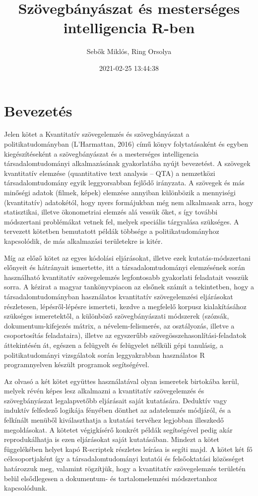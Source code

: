 \documentclass[
]{book}
\title{Szövegbányászat és mesterséges intelligencia R-ben}
\author{Sebők Miklós, Ring Orsolya}
\date{2021-02-25 13:44:38}
\begin{document}
\frontmatter
\maketitle

\mainmatter
\hypertarget{bevezetuxe9s}{%
\chapter{Bevezetés}\label{bevezetuxe9s}}

Jelen kötet a Kvantitatív szövegelemzés és szövegbányászat a
politikatudományban (L'Harmattan, 2016) című könyv folytatásaként és
egyben kiegészítéseként a szövegbányászat és a mesterséges intelligencia
társadalomtudományi alkalmazásának gyakorlatába nyújt bevezetést. A
szövegek kvantitatív elemzése (quantitative text analysis -- QTA) a
nemzetközi társadalomtudomány egyik leggyorsabban fejlődő irányzata. A
szövegek és más minőségi adatok (filmek, képek) elemzése annyiban
különbözik a mennyiségi (kvantitatív) adatokétól, hogy nyers formájukban
még nem alkalmasak arra, hogy statisztikai, illetve ökonometriai elemzés
alá vessük őket, s így további módszertani problémákat vetnek fel,
melyek speciális tárgyalása szükséges. A tervezett kötetben bemutatott
példák többsége a politikatudományhoz kapcsolódik, de más alkalmazási
területekre is kitér.

Míg az előző kötet az egyes kódolási eljárásokat, illetve ezek
kutatás-módszertani előnyeit és hátrányait ismertette, itt a
társadalomtudományi elemzésének során használható kvantitatív
szövegelemzés legfontosabb gyakorlati feladatait vesszük sorra. A
kézirat a magyar tankönyvpiacon az elsőnek számít a tekintetben, hogy a
társadalomtudományban használatos kvantitatív szövegelemzési eljárásokat
részletesen, lépésről-lépésre ismerteti, kezdve a megfelelő korpusz
kialakításához szükséges ismeretektől, a különböző szövegbányászati
módszerek (szózsák, dokumentum-kifejezés mátrix, a névelem-felismerés,
az osztályozás, illetve a csoportosítás feladataira), illetve az
egyszerűbb szövegösszehasonlítási-feladatok áttekintésén át, egészen a
felügyelt és felügyelet nélküli gépi tanulásig, a politikatudományi
vizsgálatok során leggyakrabban használatos R programnyelven készült
programok segítségével.

Az olvasó a két kötet együttes használatával olyan ismeretek birtokába
kerül, melyek révén képes lesz alkalmazni a kvantitatív szövegelemzés és
szövegbányászat legalapvetőbb eljárásait saját kutatására. Deduktív vagy
induktív felfedező logikája fényében dönthet az adatelemzés módjáról, és
a felkínált menüből kiválaszthatja a kutatási tervéhez legjobban
illeszkedő megoldásokat. A kötetet végigkísérő konkrét példák
segítségével pedig akár reprodukálhatja is ezen eljárásokat saját
kutatásában. Mindezt a kötet függelékében helyet kapó R-scriptek
részletes leírása is segíti majd. A kötet két fő célcsoportjaként így a
társadalomtudományi kutatói és felsőoktatási közösséget határozzuk meg,
valamint rögzítjük, hogy a kvantitatív szövegelemzés területén belül
elsődlegesen a dokumentum- és tartalomelemzési módszertanhoz
kapcsolódunk.
\end{document}
